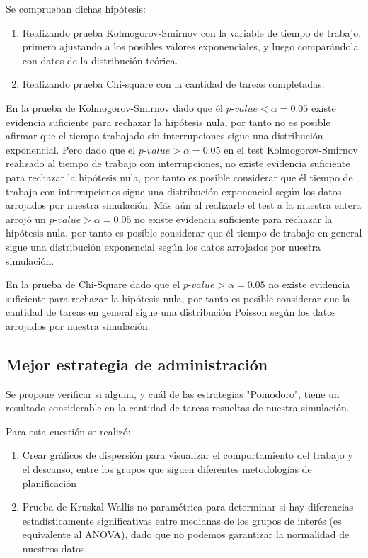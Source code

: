 \documentclass[10pt,a4paper,twocolumn]{article}
\begin{document}
Se comprueban dichas hipótesis:
\begin{enumerate}
    \item  Realizando prueba Kolmogorov-Smirnov con la variable de tiempo de trabajo, primero ajustando a los posibles valores exponenciales, y luego compar\'andola con datos de la distribución teórica.
    \item  Realizando prueba Chi-square con la cantidad de tareas completadas.
\end{enumerate}

En la prueba de Kolmogorov-Smirnov dado que \'el $p$-$value < \alpha = 0.05$ existe evidencia suficiente para rechazar la hipótesis nula, por tanto no es posible afirmar que el tiempo trabajado sin interrupciones sigue una distribución exponencial. Pero dado que el $p$-$value > \alpha = 0.05$ en el test Kolmogorov-Smirnov realizado al tiempo de trabajo con interrupciones, no existe evidencia suficiente para rechazar la hipótesis nula, por tanto es posible considerar que \'el tiempo de trabajo con interrupciones sigue una distribución exponencial seg\'un los datos arrojados por nuestra simulación. Más a\'un al realizarle el test a la muestra entera arroj\'o  un $p$-$value > \alpha = 0.05$ no existe evidencia suficiente para rechazar la hipótesis nula, por tanto es posible considerar que \'el tiempo de trabajo en general sigue una distribución exponencial seg\'un los datos arrojados por nuestra simulación.

En la prueba de Chi-Square dado que el $p$-$value > \alpha = 0.05$ no existe evidencia suficiente para rechazar la hipótesis nula, por tanto es posible considerar que la cantidad de tareas en general sigue una distribución Poisson seg\'un los datos arrojados por nuestra simulación.

\subsection{Mejor estrategia de administración}

Se propone verificar si alguna, y cu\'al de las estrategias "Pomodoro", tiene un resultado considerable en la cantidad de tareas resueltas de nuestra simulación. 

Para esta cuestión se realiz\'o:
\begin{enumerate}
    \item Crear gráficos de dispersión para visualizar el comportamiento del trabajo y el descanso, entre los grupos que siguen diferentes metodologías de planificación
    \item Prueba de Kruskal-Wallis no paramétrica para determinar si hay diferencias estadísticamente significativas entre medianas de los grupos de interés (es equivalente al ANOVA), dado que no podemos garantizar la normalidad de nuestros datos.
\end{enumerate}
\end{document}
